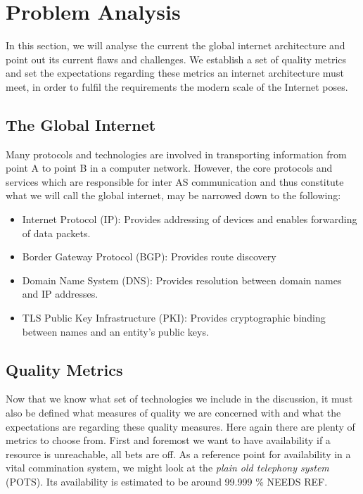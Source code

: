\documentclass[../eva1_scion.tex]{subfiles}
\begin{document}
\section{Problem Analysis}\label{sec:analysis}
In this section, we will analyse the current  the global internet architecture and point out its current flaws and challenges. We establish a set of quality metrics and set the expectations regarding these metrics an internet architecture must meet, in order to fulfil the requirements the modern scale of the Internet poses.

\subsection{The Global Internet}%
\label{ssec:the_global_internet}

Many protocols and technologies are involved in transporting information from point A to point B in a computer network. However, the core protocols and services which are responsible for inter AS  communication  and thus constitute what we will call the global internet, may be narrowed down to the following:

    \begin{itemize}
        \item Internet Protocol (IP): Provides addressing of devices and enables forwarding of data packets.
        \item Border Gateway Protocol (BGP): Provides route discovery \cite{rfc_bgp}
        \item Domain Name System (DNS): Provides resolution between domain names and IP addresses.
        \item TLS Public Key Infrastructure (PKI): Provides cryptographic binding between names and an entity's public keys.
    \end{itemize}

\subsection{Quality Metrics}\label{ssec:quality_metrics}

Now that we know what set of technologies we include in the discussion, it must also be defined what measures of quality we are concerned with and what the expectations are regarding these quality measures. Here again there are plenty of metrics to choose from. First and foremost we want to have availability \textemdash  if a resource is unreachable, all bets are off.  As a reference point for availability in a vital commination system, we might look at the \textit{plain old telephony system} (POTS). Its availability is estimated to be around 99.999 \% NEEDS REF.
\end{document}
